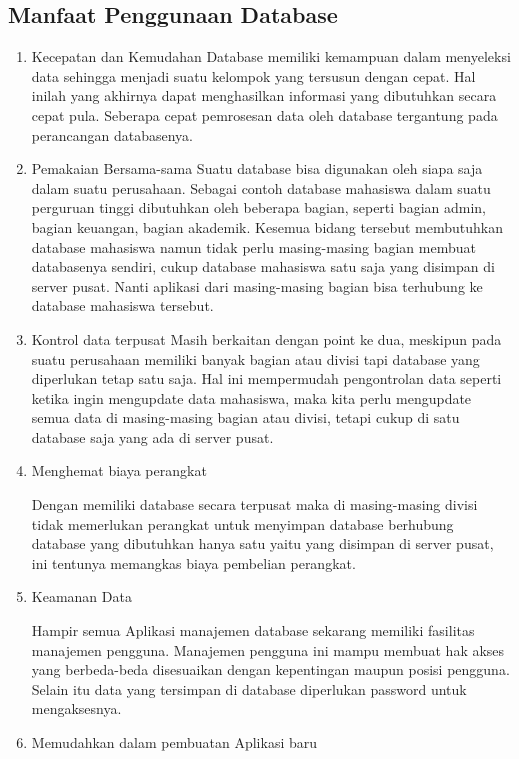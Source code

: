 \subsection {Manfaat Penggunaan Database}
	\begin{enumerate}
		\item Kecepatan dan Kemudahan 
			  Database memiliki kemampuan dalam menyeleksi data sehingga menjadi suatu kelompok yang tersusun dengan cepat. Hal inilah yang akhirnya dapat menghasilkan informasi yang dibutuhkan secara cepat pula. Seberapa cepat pemrosesan data oleh database tergantung pada perancangan databasenya.
     
		\item Pemakaian Bersama-sama 
			Suatu database bisa digunakan oleh siapa saja dalam suatu perusahaan. Sebagai contoh database mahasiswa dalam suatu perguruan tinggi dibutuhkan oleh beberapa bagian, seperti bagian admin, bagian keuangan, bagian akademik. Kesemua bidang tersebut membutuhkan database mahasiswa namun tidak perlu masing-masing bagian membuat databasenya sendiri, cukup database mahasiswa satu saja yang disimpan di server pusat. Nanti aplikasi dari masing-masing bagian bisa terhubung ke database mahasiswa tersebut. 
			
		\item Kontrol data terpusat 
Masih berkaitan dengan point ke dua, meskipun pada suatu perusahaan memiliki banyak bagian atau divisi tapi database yang diperlukan tetap satu saja. Hal ini mempermudah pengontrolan data seperti ketika ingin mengupdate data mahasiswa, maka kita perlu mengupdate semua data di masing-masing bagian atau divisi, tetapi cukup di satu database saja yang ada di server pusat. 

\item Menghemat biaya perangkat \par
Dengan memiliki database secara terpusat maka di masing-masing divisi tidak memerlukan perangkat untuk menyimpan database berhubung database yang dibutuhkan hanya satu yaitu yang disimpan di server pusat, ini tentunya memangkas biaya pembelian perangkat. \par
\vspace{12pt}
\noindent 
\item Keamanan Data \par
Hampir semua Aplikasi manajemen database sekarang memiliki fasilitas manajemen pengguna. Manajemen pengguna ini mampu membuat hak akses yang berbeda-beda disesuaikan dengan kepentingan maupun posisi pengguna. Selain itu data yang tersimpan di database diperlukan password untuk mengaksesnya. \par
\vspace{12pt}
\noindent 
\item Memudahkan dalam pembuatan Aplikasi baru\end{enumerate}
